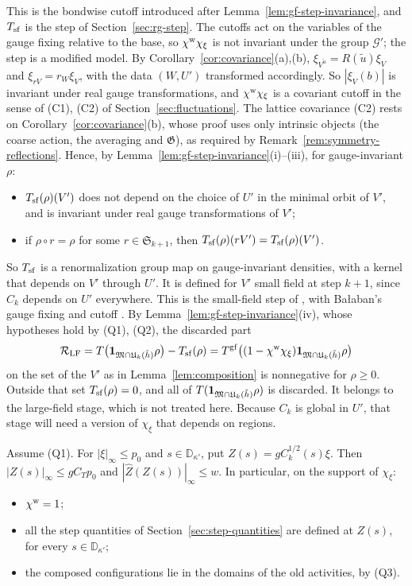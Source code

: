 This is the bondwise cutoff introduced after Lemma~\ref{lem:gf-step-invariance}, and $T_{\rm sf}$ is the step of Section~\ref{sec:rg-step}. The cutoffs act on the variables of the gauge fixing relative to the base, so $\chi^{\rm w}\chi_\xi$ is not invariant under the group $\mathcal G'$; the step is a modified model. By Corollary~\ref{cor:covariance}(a),(b), $\xi_{V^{\tilde u}}=R(\tilde u)\xi_V$ and $\xi_{rV}=r_W\xi_V$, with the data $(W,U')$ transformed accordingly. So $|\xi_V(b)|$ is invariant under real gauge transformations, and $\chi^{\rm w}\chi_\xi$ is a covariant cutoff in the sense of (C1), (C2) of Section~\ref{sec:fluctuations}. The lattice covariance (C2) rests on Corollary~\ref{cor:covariance}(b), whose proof uses only intrinsic objects (the coarse action, the averaging and $\mathfrak G$), as required by Remark~\ref{rem:symmetry-reflections}. Hence, by Lemma~\ref{lem:gf-step-invariance}(i)--(iii), for gauge-invariant $\rho$:
\begin{itemize}
\item $T_{\rm sf}(\rho)(V')$ does not depend on the choice of $U'$ in the minimal orbit of $V'$, and is invariant under real gauge transformations of $V'$;
\item if $\rho\circ r=\rho$ for some $r\in\mathfrak S_{k+1}$, then $T_{\rm sf}(\rho)(rV')=T_{\rm sf}(\rho)(V')$.
\end{itemize}
So $T_{\rm sf}$ is a renormalization group map on gauge-invariant densities, with a kernel that depends on $V'$ through $U'$. It is defined for $V'$ small field at step $k+1$, since $C_k$ depends on $U'$ everywhere. This is the small-field step of \cite[(206)]{DimockI}, with Ba\l aban's gauge fixing and cutoff \cite[(0.14)--(0.16), (2.9)]{BalYM4I}. By Lemma~\ref{lem:gf-step-invariance}(iv), whose hypotheses hold by (Q1), (Q2), the discarded part
\[
\mathcal R_{\rm LF}=T\big(\mathbf 1_{\mathfrak M\cap\mathfrak U_k(\tilde h)}\rho\big)-T_{\rm sf}(\rho)=T^{\rm gf}\big((1-\chi^{\rm w}\chi_\xi)\mathbf 1_{\mathfrak M\cap\mathfrak U_k(\tilde h)}\rho\big)
\]
on the set of the $V'$ as in Lemma~\ref{lem:composition} is nonnegative for $\rho\ge0$. Outside that set $T_{\rm sf}(\rho)=0$, and all of $T(\mathbf 1_{\mathfrak M\cap\mathfrak U_k(\tilde h)}\rho)$ is discarded. It belongs to the large-field stage, which is not treated here. Because $C_k$ is global in $U'$, that stage will need a version of $\chi_\xi$ that depends on regions.

\begin{lemma}\label{lem:white-noise}
Assume (Q1). For $|\xi|_\infty\le p_0$ and $s\in\mathbb D_{\kappa'}$, put $Z(s)=gC_k^{1/2}(s)\xi$. Then $|Z(s)|_\infty\le gC_Tp_0$ and $|\hat Z(Z(s))|_\infty\le w$. In particular, on the support of $\chi_\xi$:
\begin{itemize}
\item $\chi^{\rm w}=1$;
\item all the step quantities of Section~\ref{sec:step-quantities} are defined at $Z(s)$, for every $s\in\mathbb D_{\kappa'}$;
\item the composed configurations lie in the domains of the old activities, by (Q3).
\end{itemize}
\end{lemma}

